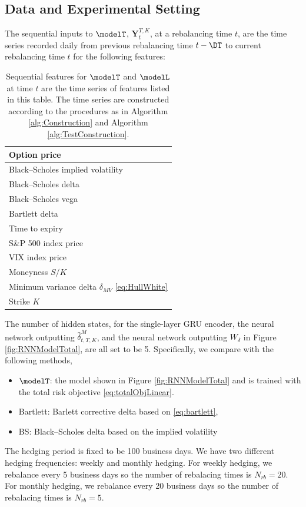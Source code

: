 \subsection{Data and Experimental Setting}
The sequential inputs to $\modelT$, $\mathbf{Y}_{t}^{T,K}$, at a rebalancing time $t$, are the  time series recorded daily from previous rebalancing time $t-\DT$ to current rebalancing time $t$ for the following features:


\begin{table}[htp!]
	\centering
	\begin{tabular}{|l|}
		\hline
		Option  price\\ \hline
		Black–Scholes implied volatility\\
		\hline
		Black–Scholes delta\\
		\hline
		Black–Scholes vega \\
		\hline
		Bartlett delta \\
		\hline
		Time to expiry \\\hline
		S\&P 500 index price\\\hline
		VIX index price\\\hline
		Moneyness $S/K$\\\hline
		Minimum variance delta $\delta_{MV}$  \eqref{eq:HullWhite}\\\hline
		Strike $K$ \\   \hline
	\end{tabular}
	\caption{Sequential features for $\modelT$ and $\modelL$ at time $t$ are the  time series of features listed in this table. The time series are constructed according to the procedures as in Algorithm \ref{alg:Construction} and Algorithm \ref{alg:TestConstruction}.}
\end{table}

The number of hidden states, for the single-layer GRU encoder, the neural network outputting $\widehat{\delta}^M_{t,T,K}$, and the neural network outputting $W_{\delta}$  in Figure \ref{fig:RNNModelTotal}, are all set to be 5.  Specifically, we compare with the following methods,
\begin{itemize}
	\item $\modelT$: the model shown in Figure \ref{fig:RNNModelTotal} and is trained with the total risk objective \eqref{eq:totalObjLinear}.
	\item Bartlett: Barlett corrective  delta based on \eqref{eq:bartlett},
	\item BS: Black–Scholes delta based on the implied volatility 
\end{itemize}
The hedging period is fixed to be 100 business days. We have two different hedging frequencies: weekly and monthly hedging. For weekly hedging, we rebalance every 5 business days so the number of rebalacing times is $N_{rb}=20$. For monthly hedging, we rebalance every 20 business days so the number of rebalacing times is $N_{rb}=5$.




